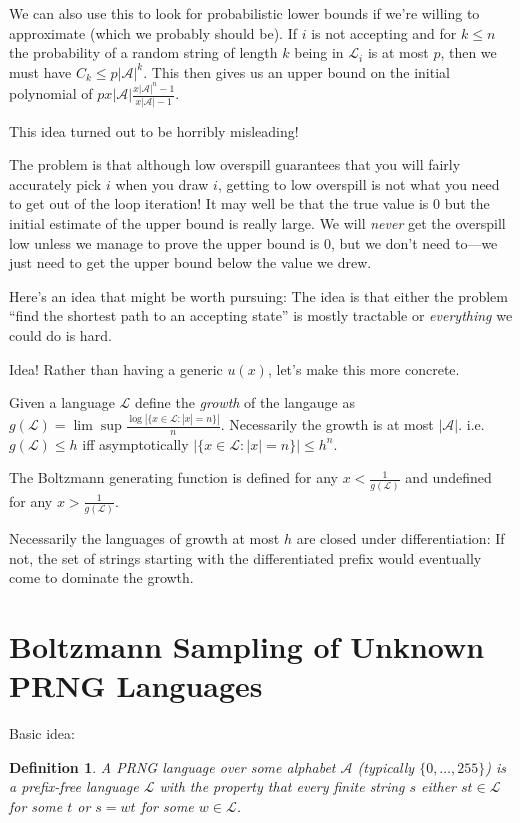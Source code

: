 \documentclass[a4paper]{book}
\newtheorem{definition}{Definition}
\begin{document}
We can also use this to look for probabilistic lower bounds if we're willing to approximate (which we probably should be).
If \(i\) is not accepting and for \(k \leq n\) the probability of a random string of length \(k\) being in \(\mathcal{L}_i\) is at most \(p\),
then we must have \(C_k \leq p |\mathcal{A}|^k\).
This then gives us an upper bound on the initial polynomial of \(p x |\mathcal{A}| \frac{{x |\mathcal{A}|}^n - 1}{x |\mathcal{A}| - 1}\).

This idea turned out to be horribly misleading!

The problem is that although low overspill guarantees that you will fairly accurately pick \(i\) when you draw \(i\),
getting to low overspill is not what you need to get out of the loop iteration!
It may well be that the true value is \(0\) but the initial estimate of the upper bound is really large.
We will \emph{never} get the overspill low unless we manage to prove the upper bound is \(0\),
but we don't need to---we just need to get the upper bound below the value we drew.

Here's an idea that might be worth pursuing:
The idea is that either the problem ``find the shortest path to an accepting state'' is mostly tractable or \emph{everything} we could do is hard.

Idea! Rather than having a generic \(u(x)\),
let's make this more concrete.

Given a language \(\mathcal{L}\) define the \emph{growth} of the langauge as \(g(\mathcal{L}) = \lim\sup \frac{\log |\{x \in \mathcal{L}: |x| = n\}|}{n}\).
Necessarily the growth is at most \(|\mathcal{A}|\).
i.e. \(g(\mathcal{L}) \leq h\) iff asymptotically \(|\{x \in \mathcal{L}: |x| = n\}| \leq h^n\).

The Boltzmann generating function is defined for any \(x < \frac{1}{g(\mathcal{L})}\) and undefined for any \(x > \frac{1}{g(\mathcal{L})}\).

Necessarily the languages of growth at most \(h\) are closed under differentiation:
If not, the set of strings starting with the differentiated prefix would eventually come to dominate the growth.

\section{Boltzmann Sampling of Unknown PRNG Languages}

Basic idea:

\begin{definition}
A PRNG language over some alphabet \(\mathcal{A}\) (typically \(\{0, \ldots, 255\}\)) is a prefix-free language \(\mathcal{L}\) with the property that every finite string \(s\) either \(st \in \mathcal{L}\) for some \(t\) or \(s = wt\) for some \(w \in \mathcal{L}\).
\end{definition}
\end{document}

